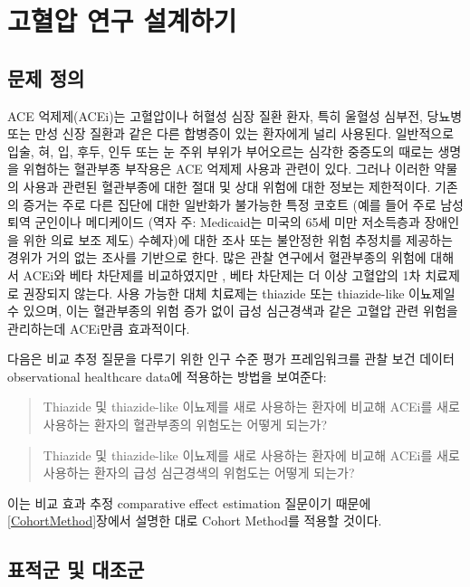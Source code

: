 \documentclass[10.5pt]{book}
\theoremstyle{definition}
\theoremstyle{definition}
\theoremstyle{definition}
\theoremstyle{remark}
\begin{document}
\section{고혈압 연구 설계하기}\label{--}

\subsection{문제 정의}\label{--1}

ACE 억제제(ACEi)는 고혈압이나 허혈성 심장 질환 환자, 특히 울혈성 심부전,
당뇨병 또는 만성 신장 질환과 같은 다른 합병증이 있는 환자에게 널리
사용된다. \citep{zaman_2002} 일반적으로 입술, 혀, 입, 후두, 인두 또는 눈
주위 부위가 부어오르는 심각한 중증도의 때로는 생명을 위협하는 혈관부종
부작용은 ACE 억제제 사용과 관련이 있다. \citep{sabroe_1997} 그러나
이러한 약물의 사용과 관련된 혈관부종에 대한 절대 및 상대 위험에 대한
정보는 제한적이다. 기존의 증거는 주로 다른 집단에 대한 일반화가 불가능한
특정 코호트 (예를 들어 주로 남성 퇴역 군인이나 메디케이드 (역자 주:
Medicaid는 미국의 65세 미만 저소득층과 장애인을 위한 의료 보조 제도)
수혜자)에 대한 조사 또는 불안정한 위험 추정치를 제공하는 경위가 거의
없는 조사를 기반으로 한다. \citep{powers_2012} 많은 관찰 연구에서
혈관부종의 위험에 대해서 ACEi와 베타 차단제를 비교하였지만
\citep{magid_2010, toh_2012}, 베타 차단제는 더 이상 고혈압의 1차
치료제로 권장되지 않는다. \citep{whelton_2018} 사용 가능한 대체 치료제는
thiazide 또는 thiazide-like 이뇨제일 수 있으며, 이는 혈관부종의 위험
증가 없이 급성 심근경색과 같은 고혈압 관련 위험을 관리하는데 ACEi만큼
효과적이다.

다음은 비교 추정 질문을 다루기 위한 인구 수준 평가 프레임워크를 관찰
보건 데이터 observational healthcare data에 적용하는 방법을 보여준다:

\begin{quote}
Thiazide 및 thiazide-like 이뇨제를 새로 사용하는 환자에 비교해 ACEi를
새로 사용하는 환자의 혈관부종의 위험도는 어떻게 되는가?
\end{quote}

\begin{quote}
Thiazide 및 thiazide-like 이뇨제를 새로 사용하는 환자에 비교해 ACEi를
새로 사용하는 환자의 급성 심근경색의 위험도는 어떻게 되는가?
\end{quote}

이는 비교 효과 추정 comparative effect estimation 질문이기 때문에
\ref{CohortMethod}장에서 설명한 대로 Cohort Method를 적용할 것이다.

\subsection{표적군 및 대조군}\label{--}
\end{document}
